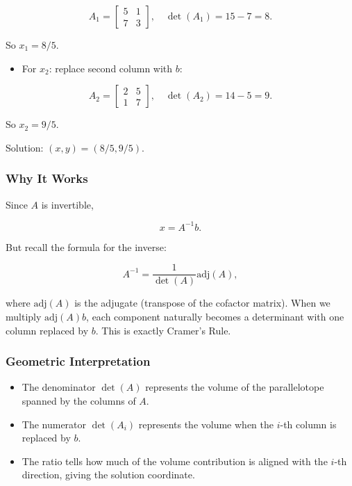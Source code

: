 \documentclass[
  letterpaper,
  DIV=11,
  numbers=noendperiod]{scrreprt}
\providecommand{\tightlist}{%
  \setlength{\itemsep}{0pt}\setlength{\parskip}{0pt}}
\begin{document}
\[
A_1 = \begin{bmatrix} 5 & 1 \\ 7 & 3 \end{bmatrix}, \quad \det(A_1) = 15 - 7 = 8.
\]

So \(x_1 = 8/5\).

\begin{itemize}
\tightlist
\item
  For \(x_2\): replace second column with \(b\):
\end{itemize}

\[
A_2 = \begin{bmatrix} 2 & 5 \\ 1 & 7 \end{bmatrix}, \quad \det(A_2) = 14 - 5 = 9.
\]

So \(x_2 = 9/5\).

Solution: \((x,y) = (8/5, 9/5)\).

\subsubsection{Why It Works}\label{why-it-works-1}

Since \(A\) is invertible,

\[
x = A^{-1}b.
\]

But recall the formula for the inverse:

\[
A^{-1} = \frac{1}{\det(A)} \text{adj}(A),
\]

where \(\text{adj}(A)\) is the adjugate (transpose of the cofactor
matrix). When we multiply \(\text{adj}(A)b\), each component naturally
becomes a determinant with one column replaced by \(b\). This is exactly
Cramer's Rule.

\subsubsection{Geometric
Interpretation}\label{geometric-interpretation-13}

\begin{itemize}
\tightlist
\item
  The denominator \(\det(A)\) represents the volume of the parallelotope
  spanned by the columns of \(A\).
\item
  The numerator \(\det(A_i)\) represents the volume when the \(i\)-th
  column is replaced by \(b\).
\item
  The ratio tells how much of the volume contribution is aligned with
  the \(i\)-th direction, giving the solution coordinate.
\end{itemize}
\end{document}

